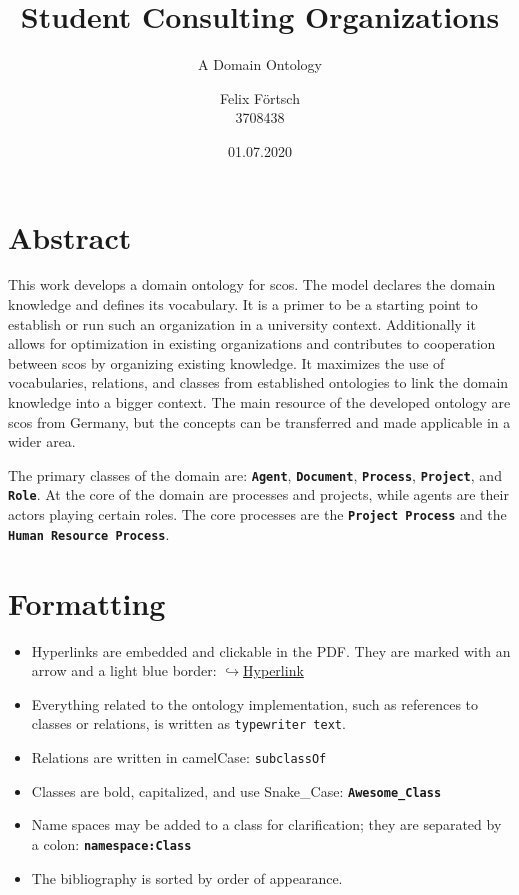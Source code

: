\documentclass[a4paper, DIV=13, BCOR=0cm]{scrbook}
\newcommand{\class}[1]{\texttt{\textbf{#1}}}
\newcommand{\link}[2]{\href{#1}{$\hookrightarrow$#2}}
\begin{document}
\titlehead{
	Document Version: v18 \\
	Overall Progress: 
}
\subject{Bachelor's Thesis}
\title{Student Consulting Organizations}
\subtitle{A Domain Ontology}
\author{Felix Förtsch \\ 3708438}
\date{01.07.2020}
\publishers{Leipzig University}
\maketitle

\frontmatter
\chapter*{Abstract }
	This work develops a domain ontology for \glspl{sco}. The model declares the domain knowledge and defines its vocabulary. It is a primer to be a starting point to establish or run such an organization in a university context. Additionally it allows for optimization in existing organizations and contributes to cooperation between \glspl{sco} by organizing existing knowledge. It maximizes the use of vocabularies, relations, and classes from established ontologies to link the domain knowledge into a bigger context. The main resource of the developed ontology are \glspl{sco} from Germany, but the concepts can be transferred and made applicable in a wider area.
	
	The primary classes of the domain are: \class{Agent}, \class{Document}, \class{Process}, \class{Project}, and \class{Role}. At the core of the domain are processes and projects, while agents are their actors playing certain roles. The core processes are the \class{Project Process} and the \class{Human Resource Process}.

\chapter*{Formatting}
\begin{itemize}
	\item Hyperlinks are embedded and clickable in the PDF. They are marked with an arrow and a light blue border: \link{https://hyperlink.com}{Hyperlink}
	\item Everything related to the ontology implementation, such as references to classes or relations, is written as \texttt{typewriter text}.
	\item Relations are written in camelCase: \texttt{subclassOf}
	\item Classes are bold, capitalized, and use Snake\_Case: \texttt{\textbf{Awesome\_Class}}
	\item Name spaces may be added to a class for clarification; they are separated by a colon: \class{namespace:Class}
	\item The bibliography is sorted by order of appearance.
\end{itemize}
\end{document}
